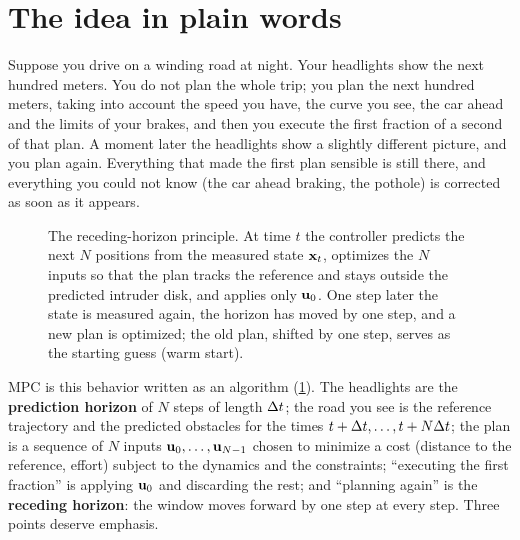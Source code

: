 \section{The idea in plain words}
\label{sec:ch21-intuition}

Suppose you drive on a winding road at night. Your headlights show the next
hundred meters. You do not plan the whole trip; you plan the next hundred
meters, taking into account the speed you have, the curve you see, the car
ahead and the limits of your brakes, and then you execute the first fraction
of a second of that plan. A moment later the headlights show a slightly
different picture, and you plan again. Everything that made the first plan
sensible is still there, and everything you could not know (the car ahead
braking, the pothole) is corrected as soon as it appears.

\begin{figure}[tb]
  \centering
  \caption{The receding-horizon principle. At time $t$ the controller predicts
  the next $N$ positions from the measured state $\mathbf{x}_t$, optimizes the $N$
  inputs so that the plan tracks the reference and stays outside the predicted
  intruder disk, and applies only $\mathbf{u}_0$. One step later the state is
  measured again, the horizon has moved by one step, and a new plan is
  optimized; the old plan, shifted by one step, serves as the starting guess
  (warm start).}
  \label{fig:ch21-idea}
\end{figure}

MPC is this behavior written as an algorithm (\cref{fig:ch21-idea}). The
headlights are the \textbf{prediction horizon} of
$N$ steps of length $\Delta t$; the road you see is the reference trajectory and
the predicted obstacles for the times $t+\Delta t,\dots,t+N\Delta t$; the plan is a
sequence of $N$ inputs $\mathbf{u}_0,\dots,\mathbf{u}_{N-1}$ chosen to minimize a cost
(distance to the reference, effort) subject to the dynamics and the
constraints; ``executing the first fraction'' is applying $\mathbf{u}_0$ and
discarding the rest; and ``planning again'' is the \textbf{receding
horizon}: the window moves forward by one step at
every step. Three points deserve emphasis.

